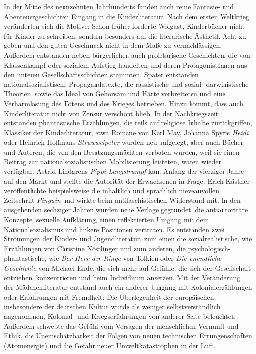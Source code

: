     In der Mitte des neunzehnten Jahrhunderts fanden auch reine Fantasie- und
    Abenteuergeschichten Eingang in die Kinderliteratur. Nach dem ersten
    Weltkrieg veränderten sich die Motive: Schon früher forderte Wolgast,
    Kinderbücher nicht für Kinder zu schreiben, sondern besonders auf die
    literarische Ästhetik Acht zu geben und den guten Geschmack nicht in dem
    Maße zu vernachlässigen. Außerdem entstanden neben bürgerlichen auch
    proletarische Geschichten, die von Klassenkampf oder sozialem Aufstieg
    handelten und deren ProtagonistInnen aus den unteren Gesellschaftsschichten
    stammten. Später entstanden nationalsozialistische Propagandatexte, die
    rassistische und sozial- darwinistische  Theorien, sowie das Ideal von
    Gehorsam und Härte verbreiteten und eine Verharmlosung des Tötens und des
    Krieges betrieben. Hinzu kommt, dass auch Kinderliteratur nicht von Zensur
    verschont blieb. In der Nachkriegszeit entstanden phantastische Erzählungen,
    die teils auf religiöse Inhalte zurückgriffen, Klassiker der
    Kinderliteratur, etwa  Romane von Karl May, Johanna Spyris \emph{Heidi} oder
    Heinrich Hoffmans \emph{Struwwelpeter} wurden neu aufgelegt, aber auch
    Bücher und Autoren, die von den Besatzungsmächten verboten wurden, weil sie
    einen Beitrag zur nationalsozialistischen  Mobilisierung leisteten, waren
    wieder verfügbar. Astrid Lindgrens \emph{Pippi Langstrumpf} kam Anfang der
    vierziger Jahre auf den Markt und stellte die Autorität der Erwachsenen in
    Frage. Erich Kästner veröffentlichte beispielsweise die inhaltlich und
    sprachlich nieveauvollen Zeitschrift \emph{Pinguin} und wirkte beim
    antifaschistischen Widerstand mit. \parencite[37]{Kaminski1989} In den
    ausgehenden sechziger Jahren wurden neue Verlage gegründet, die
    antiautoritäre Konzepte, sexuelle Aufklärung, einen reflektierten Umgang mit
    dem Nationalsozialismus und linkere Positionen vertraten. Es entstanden zwei
    Strömungen der Kinder- und Jugendliteratur, zum einen die
    sozialrealistische, wie Erzählungen von Christine Nöstlinger und zum
    anderen, die psychologisch- phantastische, wie \emph{Der Herr der Ringe} von
    Tolkien oder \emph{Die unendliche Geschichte} von Michael Ende, die sich
    mehr auf Gefühle, die sich der Gesellschaft entziehen, konzentrieren und
    beim Individuum ansetzen.  Mit der Veränderung der Mädchenliteratur entstand
    auch ein anderer Umgang mit Kolonialerzählungen oder Erfahrungen mit
    Fremdheit: Die Überlegenheit der europäischen, insbesondere der deutschen
    Kultur wurde als weniger selbstverständlich angenommen, Kolonial- und
    Kriegserfahrungen von anderer Seite beleuchtet. Außerdem schwebte das Gefühl
    vom Versagen der menschlichen Vernunft und Ethik, die Uneinschätzbarkeit der
    Folgen von neuen technischen Errungenschaften (Atomenergie) und die Gefahr
    neuer Umweltkatastrophen in der Luft.

